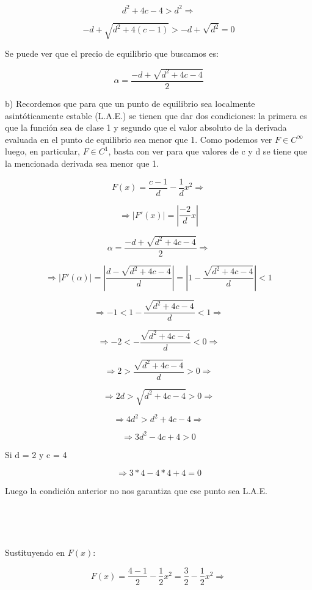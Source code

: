 \documentclass[11pt, a4paper]{article}
\newif\IfInSansMode
\numberwithin{equation}{section}
\theoremstyle{theorem-style}
\theoremstyle{definition-style}
\theoremstyle{remark-style}
\theoremstyle{example-style}
\begin{document}
    \[
        d^{2} +4c-4 > d^{2} \Rightarrow 
    \]

    \[
        -d + \sqrt{d^2 +4(c-1)} > -d + \sqrt{d^{2}} = 0
    \]

    Se puede ver que el precio de equilibrio que buscamos es:

    \[
        \alpha = \frac{-d+\sqrt{d^{2} +4c-4}}{2}
    \]

    b) 
    Recordemos que para que un punto de equilibrio sea localmente asintóticamente estable (L.A.E.) se tienen que dar dos condiciones: la primera es que la funci\'on sea de clase 1 y segundo que el valor absoluto de la derivada evaluada en el punto de equilibrio sea menor que 1. Como podemos ver $F \in C^{\infty}$ luego, en particular, $F \in C^{1}$, basta con ver para que valores de c y d se tiene que la mencionada derivada sea menor que 1.

    \[
        F(x) = \frac{c-1}{d} - \frac{1}{d}x^{2} \Rightarrow
    \]

    \[
        \Rightarrow |F'(x)| = |\frac{-2}{d}x| 
    \]

    \[
        \alpha = \frac{-d+\sqrt{d^{2} +4c-4}}{2} \Rightarrow
    \]

    \[
        \Rightarrow |F'(\alpha)| = |\frac{d-\sqrt{d^{2}+4c-4}}{d}| = | 1 - \frac {\sqrt{d^{2}+4c-4}}{d}| < 1
    \]

    \[
        \Rightarrow -1 <  1 - \frac {\sqrt{d^{2}+4c-4}}{d} < 1 \Rightarrow
    \]

    \[
        \Rightarrow -2 < - \frac {\sqrt{d^{2}+4c-4}}{d} < 0 \Rightarrow
    \]

    \[
        \Rightarrow 2 > \frac {\sqrt{d^{2}+4c-4}}{d} > 0 \Rightarrow
    \]

    \[
        \Rightarrow 2d > \sqrt{d^{2}+4c-4} > 0 \Rightarrow
    \]

    \[
        \Rightarrow 4d^{2} > d^{2}+4c-4 \Rightarrow 
    \]

    \[
        \Rightarrow 3d^{2}-4c+4 > 0
    \]

    Si d = 2 y c = 4

    \[
        \Rightarrow 3*4 - 4*4 +4 = 0 
    \]

    Luego la condici\'on anterior no nos garantiza que ese punto sea L.A.E.
    \

    \

    \

    Sustituyendo en $F(x)$:

    \[
        F(x) = \frac{4-1}{2} - \frac{1}{2}x^{2} = \frac{3}{2} - \frac{1}{2}x^{2}\Rightarrow
    \]
\end{document}
